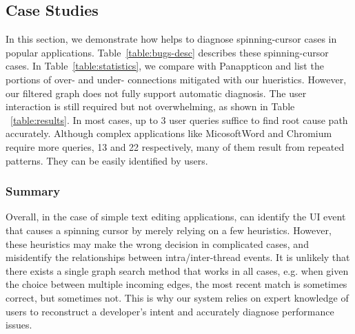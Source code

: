 \subsection{Case Studies}\label{sec:casestudy}

In this section, we demonstrate how \xxx helps to diagnose \nbug spinning-cursor
cases in popular applications. Table~\ref{table:bugs-desc} describes these
spinning-cursor cases. In Table~\ref{table:statistics}, we compare \xxx with
Panappticon and list the portions of over- and under- connections mitigated with
our hueristics. However, our filtered graph does not fully support automatic
diagnosis. The user interaction is still required but not overwhelming, as shown
in Table ~\ref{table:results}. In most cases, up to 3 user queries suffice to
find root cause path accurately. Although complex applications like MicosoftWord
and Chromium require more queries, 13 and 22 respectively, many of them result
from repeated patterns. They can be easily identified by users.








\subsubsection{Summary}
Overall, in the case of simple text editing applications, \xxx can identify the
UI event that causes a spinning cursor by merely relying on a few heuristics.
However, these heuristics may make the wrong decision in complicated cases, and
misidentify the relationships between intra/inter-thread events. It is unlikely
that there exists a single graph search method that works in all cases, e.g.
when given the choice between multiple incoming edges, the most recent match is
sometimes correct, but sometimes not. This is why our system relies on expert
knowledge of users to reconstruct a developer's intent and accurately diagnose
performance issues.
